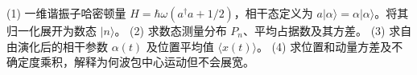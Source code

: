 (1) 一维谐振子哈密顿量 \(H=\hbar\omega(a^\dagger a+1/2)\)，相干态定义为 \(a|\alpha\rangle=\alpha|\alpha\rangle\)。将其归一化展开为数态 \(|n\rangle\)。
(2) 求数态测量分布 \(P_n\)、平均占据数及其方差。
(3) 求自由演化后的相干参数 \(\alpha(t)\) 及位置平均值 \(\langle x(t)\rangle\)。
(4) 求位置和动量方差及不确定度乘积，解释为何波包中心运动但不会展宽。
